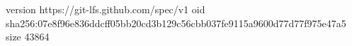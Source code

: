 version https://git-lfs.github.com/spec/v1
oid sha256:07e8f96e836ddcff05bb20cd3b129c56cbb037fe9115a9600d77d77f975e47a5
size 43864
